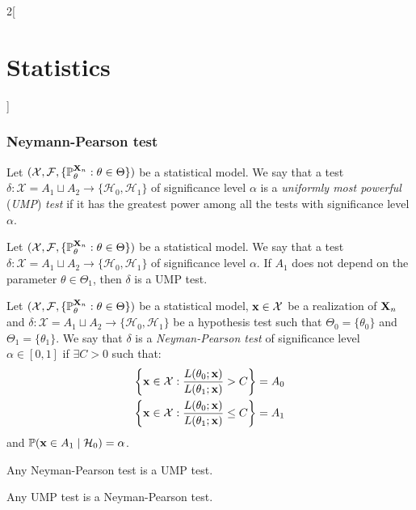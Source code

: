 \documentclass[../../../main.tex]{subfiles}
\begin{document}
\begin{multicols}{2}[\section{Statistics}]
  \subsubsection{Neymann-Pearson test}
  \begin{definition}
    Let $(\mathcal{X},\mathcal{F},\{\mathbb{P}_\theta^{\boldsymbol{\mathrm{X}}_n}:\theta\in\Theta\})$ be a statistical model. We say that a test $\delta:\mathcal{X}=A_1\sqcup A_2\rightarrow\{\mathcal{H}_0,\mathcal{H}_1\}$ of significance level $\alpha$ is a \emph{uniformly most powerful} (\emph{UMP}) \emph{test} if it has the greatest power among all the tests with significance level $\alpha$.
  \end{definition}
  \begin{lemma}
    Let $(\mathcal{X},\mathcal{F},\{\mathbb{P}_\theta^{\boldsymbol{\mathrm{X}}_n}:\theta\in\Theta\})$ be a statistical model. We say that a test $\delta:\mathcal{X}=A_1\sqcup A_2\rightarrow\{\mathcal{H}_0,\mathcal{H}_1\}$ of significance level $\alpha$. If $A_1$ does not depend on the parameter $\theta\in\Theta_1$, then $\delta$ is a UMP test.
  \end{lemma}
  \begin{definition}
    Let $(\mathcal{X},\mathcal{F},\{\mathbb{P}_\theta^{\boldsymbol{\mathrm{X}}_n}:\theta\in\Theta\})$ be a statistical model, $\boldsymbol{\mathrm{x}}\in\mathcal{X}$ be a realization of $\boldsymbol{\mathrm{X}}_n$ and $\delta:\mathcal{X}=A_1\sqcup A_2\rightarrow\{\mathcal{H}_0,\mathcal{H}_1\}$ be a hypothesis test such that $\Theta_0=\{\theta_0\}$ and $\Theta_1=\{\theta_1\}$. We say that $\delta$ is a \emph{Neyman-Pearson test} of significance level $\alpha\in[0,1]$ if $\exists C>0$ such that:
    \begin{gather*}
      \left\{\boldsymbol{\mathrm{x}}\in\mathcal{X}:\frac{L(\theta_0;\boldsymbol{\mathrm{x}})}{L(\theta_1;\boldsymbol{\mathrm{x}})}> C\right\}= A_0\\
      \left\{\boldsymbol{\mathrm{x}}\in\mathcal{X}:\frac{L(\theta_0;\boldsymbol{\mathrm{x}})}{L(\theta_1;\boldsymbol{\mathrm{x}})}\leq C\right\}= A_1
    \end{gather*}
    and $\mathbb{P}(\boldsymbol{\mathrm{x}}\in A_1\mid \mathcal{H}_0)=\alpha$.
  \end{definition}
  \begin{lemma}
    Any Neyman-Pearson test is a UMP test.
  \end{lemma}
  \begin{theorem}
    Any UMP test is a Neyman-Pearson test.
  \end{theorem}

\end{multicols}
\end{document}

